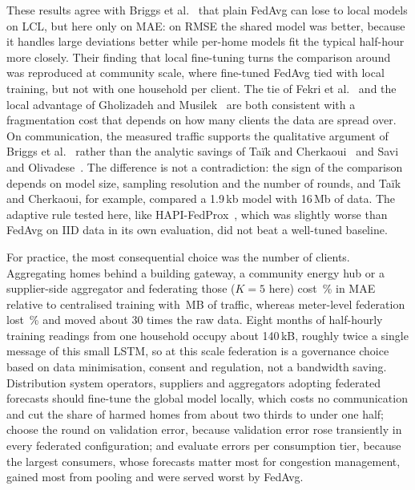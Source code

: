 These results agree with Briggs et al.~\cite{briggs2022} that plain FedAvg can lose to local models on LCL, but here
only on MAE: on RMSE the shared model was better, because it handles large deviations better while per-home models fit
the typical half-hour more closely. Their finding that local fine-tuning turns the comparison around was reproduced at
community scale, where fine-tuned FedAvg tied with local training, but not with one household per client. The tie of
Fekri et al.~\cite{fekri2022} and the local advantage of Gholizadeh and Musilek~\cite{gholizadeh2022} are both
consistent with a fragmentation cost that depends on how many clients the data are spread over. On communication, the
measured traffic supports the qualitative argument of Briggs et al.~\cite{briggs2020ccai} rather than the analytic
savings of Taïk and Cherkaoui~\cite{taik2020} and Savi and Olivadese~\cite{savi2021}. The difference is not a
contradiction: the sign of the comparison depends on model size, sampling resolution and the number of rounds, and
Taïk and Cherkaoui, for example, compared a 1.9\,kb model with 16\,Mb of data. The adaptive rule tested here,
like HAPI-FedProx~\cite{mhou2025hapi}, which was slightly worse than FedAvg on IID data in its own evaluation, did not
beat a well-tuned baseline.

For practice, the most consequential choice was the number of clients. Aggregating homes behind a building gateway, a
community energy hub or a supplier-side aggregator and federating those ($K=5$ here) cost
\nosign{\EonefourfedavgKfiveGap}\,\% in MAE relative to centralised training with \EonefourfedavgKfiveMB{}\,MB of
traffic, whereas meter-level federation lost \nosign{\EonethreefedavghouseholdGap}\,\% and moved about 30 times the raw
data. Eight months of half-hourly training readings from one household occupy about 140\,kB, roughly twice a single
message of this small LSTM, so at this scale federation is a governance choice based on data minimisation, consent and
regulation, not a bandwidth saving. Distribution system operators, suppliers and aggregators adopting federated
forecasts should fine-tune the global model locally, which costs no communication and cut the share of harmed homes
from about two thirds to under one half; choose the round on validation error, because validation error rose transiently in every federated
configuration; and evaluate errors per consumption tier, because the largest consumers, whose forecasts matter most for
congestion management, gained most from pooling and were served worst by FedAvg.

